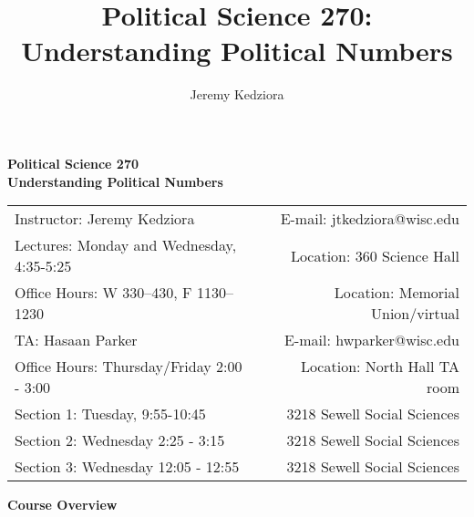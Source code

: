 \documentclass[12pt]{article}
\title{Political Science 270: Understanding Political Numbers}
\author{Jeremy Kedziora}
\begin{document}
\begin{center}
\noindent\huge \textbf{Political Science 270\\Understanding Political Numbers}\\
\end{center}
\vspace{10mm}

\normalsize\noindent
\begin{tabular*}{6.5in}{l@{\extracolsep{\fill}}r}
Instructor: Jeremy Kedziora & E-mail: jtkedziora@wisc.edu\\
Lectures: Monday and Wednesday, 4:35-5:25 & Location: 360 Science Hall\\
Office Hours: W 330--430, F 1130--1230 & Location: Memorial Union/virtual\\
\hline
\hline
TA: Hasaan Parker& E-mail: hwparker@wisc.edu\\
Office Hours: Thursday/Friday 2:00 - 3:00 & Location: North Hall TA room\\
\hline
\hline
Section 1: Tuesday, 9:55-10:45& 3218 Sewell Social Sciences\\
Section 2: Wednesday 2:25 - 3:15& 3218 Sewell Social Sciences\\
Section 3: Wednesday 12:05 - 12:55& 3218 Sewell Social Sciences\\
\end{tabular*}
\vspace{10mm}

\noindent \Large \textbf{Course Overview}\normalsize\\
\end{document}
